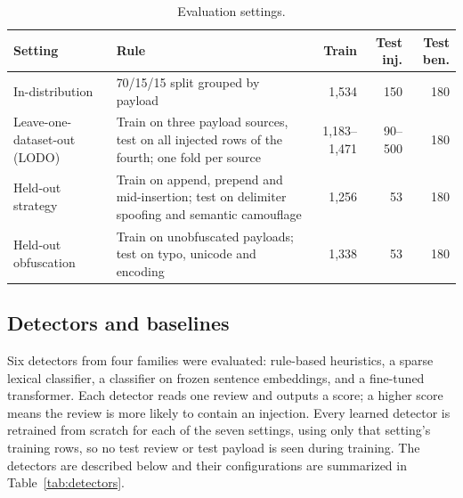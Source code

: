 \documentclass[11pt,a4paper]{article}
\begin{document}
\begin{table}[h]
\centering
\caption{Evaluation settings.}
\label{tab:settings}
\begin{tabularx}{\textwidth}{>{\raggedright\arraybackslash}p{2.6cm}Lrrr}
\toprule
Setting & Rule & Train & Test inj. & Test ben. \\
\midrule
In-distribution & 70/15/15 split grouped by payload & 1,534 & 150 & 180 \\
Leave-one-dataset-out (LODO) & Train on three payload sources, test on all injected rows of the fourth; one fold per source \citep{fomin2026} & 1,183--1,471 & 90--500 & 180 \\
Held-out strategy & Train on append, prepend and mid-insertion; test on delimiter spoofing and semantic camouflage & 1,256 & 53 & 180 \\
Held-out obfuscation & Train on unobfuscated payloads; test on typo, unicode and encoding & 1,338 & 53 & 180 \\
\bottomrule
\end{tabularx}
\end{table}

\subsection{Detectors and baselines}

Six detectors from four families were evaluated: rule-based heuristics, a sparse lexical classifier, a classifier on frozen sentence embeddings, and a fine-tuned transformer. Each detector reads one review and outputs a score; a higher score means the review is more likely to contain an injection. Every learned detector is retrained from scratch for each of the seven settings, using only that setting's training rows, so no test review or test payload is seen during training. The detectors are described below and their configurations are summarized in Table~\ref{tab:detectors}.
\end{document}

